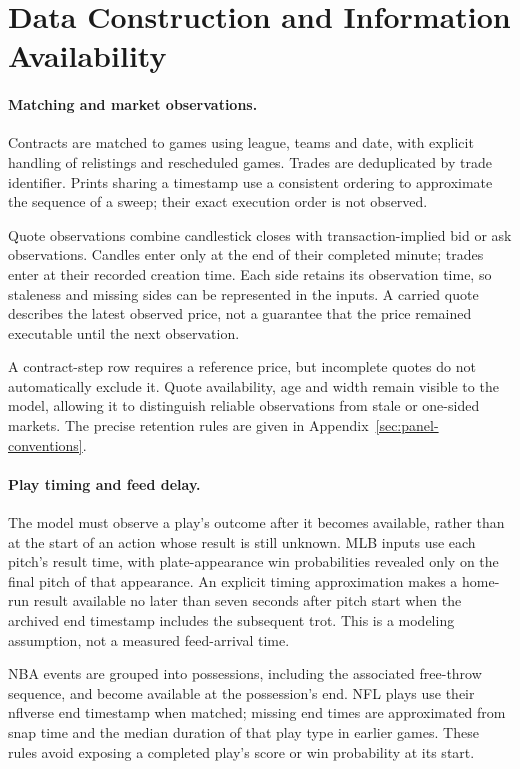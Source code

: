 \documentclass[12pt,a4paper,oneside]{report}
\begin{document}
\section{Data Construction and Information Availability}\label{sec:asof}
\paragraph{Matching and market observations.}
Contracts are matched to games using league, teams and date, with explicit
handling of relistings and rescheduled games. Trades are deduplicated by trade
identifier. Prints sharing a timestamp use a consistent ordering to approximate
the sequence of a sweep; their exact execution order is not observed.

Quote observations combine candlestick closes with transaction-implied bid or
ask observations. Candles enter only at the end of their completed minute;
trades enter at their recorded creation time. Each side retains its observation
time, so staleness and missing sides can be represented in the inputs. A carried
quote describes the latest observed price, not a guarantee that the price
remained executable until the next observation.

A contract-step row requires a reference price, but incomplete quotes do not
automatically exclude it. Quote availability, age and width remain visible
to the model, allowing it to distinguish reliable observations from stale
or one-sided markets. The precise retention rules are given in
Appendix~\ref{sec:panel-conventions}.

\paragraph{Play timing and feed delay.}
The model must observe a play's outcome after it becomes available, rather than
at the start of an action whose result is still unknown. MLB inputs use each
pitch's result time, with plate-appearance win probabilities revealed only on
the final pitch of that appearance. An explicit timing approximation makes a
home-run result available no later than seven seconds after pitch start when
the archived end timestamp includes the subsequent trot. This is a modeling
assumption, not a measured feed-arrival time.

NBA events are grouped into possessions, including the associated free-throw
sequence, and become available at the possession's end. NFL plays use their
nflverse end timestamp when matched; missing end times are approximated from
snap time and the median duration of that play type in earlier games. These
rules avoid exposing a completed play's score or win probability at its start.
\end{document}
